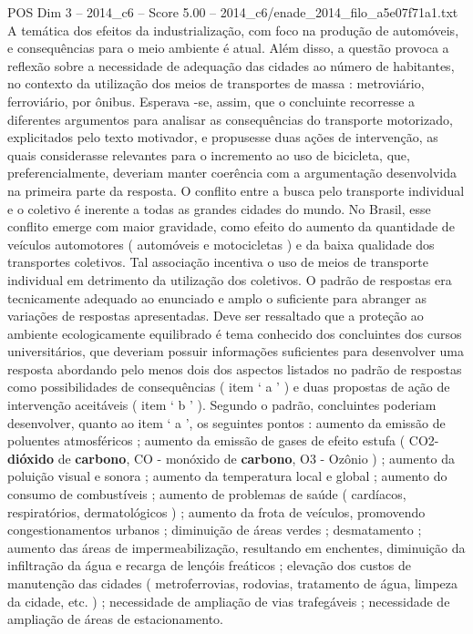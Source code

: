 \begin{textsample}{POS Dim 3 – 2014\_c6 – Score 5.00 – 2014\_c6/enade\_2014\_filo\_a5e07f71a1.txt}
A temática dos efeitos da industrialização, com foco na produção de automóveis, e consequências para o meio ambiente é atual.
Além disso, a questão provoca a reflexão sobre a necessidade de adequação das cidades ao número de habitantes, no contexto da utilização dos meios de transportes de massa : metroviário, ferroviário, por ônibus.
Esperava -se, assim, que o concluinte recorresse a diferentes argumentos para analisar as consequências do transporte motorizado, explicitados pelo texto motivador, e propusesse duas ações de intervenção, as quais considerasse relevantes para o incremento ao uso de bicicleta, que, preferencialmente, deveriam manter coerência com a argumentação desenvolvida na primeira parte da resposta.
O conflito entre a busca pelo transporte individual e o coletivo é inerente a todas as grandes cidades do mundo.
No Brasil, esse conflito emerge com maior gravidade, como efeito do aumento da quantidade de veículos automotores ( automóveis e motocicletas ) e da baixa qualidade dos transportes coletivos.
Tal associação incentiva o uso de meios de transporte individual em detrimento da utilização dos coletivos.
O padrão de respostas era tecnicamente adequado ao enunciado e amplo o suficiente para abranger as variações de respostas apresentadas.
Deve ser ressaltado que a proteção ao ambiente ecologicamente equilibrado é tema conhecido dos concluintes dos cursos universitários, que deveriam possuir informações suficientes para desenvolver uma resposta abordando pelo menos dois dos aspectos listados no padrão de respostas como possibilidades de consequências ( item ‘ a ’ ) e duas propostas de ação de intervenção aceitáveis ( item ‘ b ’ ).
Segundo o padrão, concluintes poderiam desenvolver, quanto ao item ‘ a ’, os seguintes pontos : aumento da emissão de poluentes atmosféricos ; aumento da emissão de gases de efeito estufa ( CO2- \textbf{dióxido} de \textbf{carbono}, CO - monóxido de \textbf{carbono}, O3 - Ozônio ) ; aumento da poluição visual e sonora ; aumento da temperatura local e global ; aumento do consumo de combustíveis ; aumento de problemas de saúde ( cardíacos, respiratórios, dermatológicos ) ; aumento da frota de veículos, promovendo congestionamentos urbanos ; diminuição de áreas verdes ; desmatamento ; aumento das áreas de impermeabilização, resultando em enchentes, diminuição da infiltração da água e recarga de lençóis freáticos ; elevação dos custos de manutenção das cidades ( metroferrovias, rodovias, tratamento de água, limpeza da cidade, etc. ) ; necessidade de ampliação de vias trafegáveis ; necessidade de ampliação de áreas de estacionamento.

\end{textsample}
